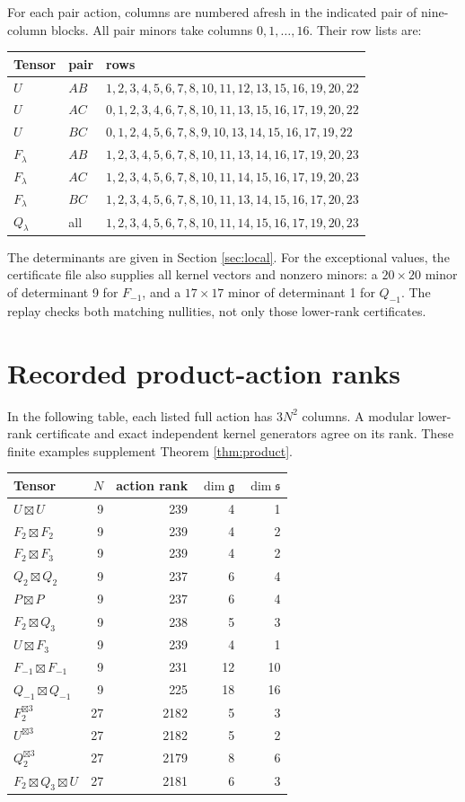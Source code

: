 \documentclass[11pt]{article}
\theoremstyle{remark}\newtheorem{remark}[theorem]{Remark}
\newcommand{\gp}{\boxtimes}
\newcommand{\g}{\mathfrak g}
\newcommand{\s}{\mathfrak s}
\begin{document}
For each pair action, columns are numbered afresh in the indicated pair of nine-column blocks. All pair minors take columns $0,1,\ldots,16$. Their row lists are:
\begin{center}\small
\begin{tabular}{llp{}}
\toprule
Tensor & pair & rows\\
\midrule
$U$ & $AB$ & $1,2,3,4,5,6,7,8,10,11,12,13,15,16,19,20,22$\\
$U$ & $AC$ & $0,1,2,3,4,6,7,8,10,11,13,15,16,17,19,20,22$\\
$U$ & $BC$ & $0,1,2,4,5,6,7,8,9,10,13,14,15,16,17,19,22$\\[2pt]
$F_\lambda$ & $AB$ & $1,2,3,4,5,6,7,8,10,11,13,14,16,17,19,20,23$\\
$F_\lambda$ & $AC$ & $1,2,3,4,5,6,7,8,10,11,14,15,16,17,19,20,23$\\
$F_\lambda$ & $BC$ & $1,2,3,4,5,6,7,8,10,11,13,14,15,16,17,20,23$\\[2pt]
$Q_\lambda$ & all & $1,2,3,4,5,6,7,8,10,11,14,15,16,17,19,20,23$\\
\bottomrule
\end{tabular}\end{center}
The determinants are given in Section \ref{sec:local}. For the exceptional values, the certificate file also supplies all kernel vectors and nonzero minors: a $20\times20$ minor of determinant 9 for $F_{-1}$, and a $17\times17$ minor of determinant 1 for $Q_{-1}$. The replay checks both matching nullities, not only those lower-rank certificates.

\section{Recorded product-action ranks}\label{app:ranks}
In the following table, each listed full action has $3N^2$ columns. A modular lower-rank certificate and exact independent kernel generators agree on its rank. These finite examples supplement Theorem \ref{thm:product}.
\begin{center}\small
\begin{tabular}{lrrrr}
\toprule
Tensor & $N$ & action rank & $\dim\g$ & $\dim\s$\\
\midrule
$U\gp U$ &9&239&4&1\\
$F_2\gp F_2$ &9&239&4&2\\
$F_2\gp F_3$ &9&239&4&2\\
$Q_2\gp Q_2$ &9&237&6&4\\
$P\gp P$ &9&237&6&4\\
$F_2\gp Q_3$ &9&238&5&3\\
$U\gp F_3$ &9&239&4&1\\
$F_{-1}\gp F_{-1}$ &9&231&12&10\\
$Q_{-1}\gp Q_{-1}$ &9&225&18&16\\
$F_2^{\gp3}$ &27&2182&5&3\\
$U^{\gp3}$ &27&2182&5&2\\
$Q_2^{\gp3}$ &27&2179&8&6\\
$F_2\gp Q_3\gp U$ &27&2181&6&3\\
\bottomrule
\end{tabular}
\end{center}
\end{document}

